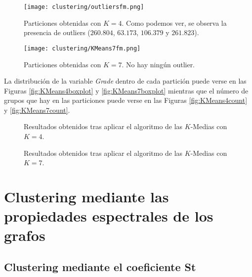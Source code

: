 \begin{figure}[H]
    \centering
    \texttt{[image: clustering/outliersfm.png]}
    \caption{Particiones obtenidas con $K = 4$. Como podemos ver, se observa la presencia de outliers ($260.804$, $63.173$, $106.379$ y $261.823$).}
    \label{fig:KMeans4}
\end{figure}

\begin{figure}[H]
    \centering
    \texttt{[image: clustering/KMeans7fm.png]}
    \caption{Particiones obtenidas con $K = 7$. No hay ningún outlier.}
    \label{fig:KMeans7}
\end{figure}

La distribución de la variable \emph{Grade} dentro de cada partición puede verse en las Figuras \ref{fig:KMeans4boxplot} y \ref{fig:KMeans7boxplot} mientras que el número de grupos que hay en las particiones puede verse en las Figuras \ref{fig:KMeans4count} y \ref{fig:KMeans7count}.

\begin{figure}[H]
\centering
{}\qquad
{}%
\caption{Resultados obtenidos tras aplicar el algoritmo de las $K$-Medias con $K = 4$.}
\label{fig:KMeans4details}
\end{figure}

\begin{figure}[H]
\centering
{}\qquad
{}%
\caption{Resultados obtenidos tras aplicar el algoritmo de las $K$-Medias con $K = 7$.}
\label{fig:KMeans7details}
\end{figure}

\section{Clustering mediante las propiedades espectrales de los grafos}
\subsection{Clustering mediante el coeficiente St}

